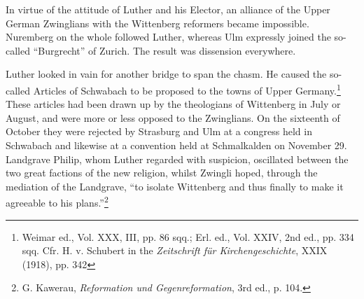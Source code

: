 In virtue of the attitude of Luther and his Elector, an alliance of
the Upper German Zwinglians with the Wittenberg reformers became impossible.
Nuremberg on the whole followed Luther, whereas
Ulm expressly joined the so-called “Burgrecht” of Zurich. The result
was dissension everywhere.

Luther looked in vain for another bridge to span the chasm. He
caused the so-called Articles of Schwabach to be proposed to the
towns of Upper Germany.\footnote
{Weimar ed., Vol. XXX, III, pp. 86 sqq.; Erl. ed., Vol. XXIV, 2nd ed., pp. 334 sqq.
Cfr. H. v. Schubert in the \textit{Zeitschrift für Kirchengeschichte}, XXIX (1918), pp. 342}
These articles had been drawn up by
the theologians of Wittenberg in July or August, and were more
or less opposed to the Zwinglians. On the sixteenth of October they
were rejected by Strasburg and Ulm at a congress held in Schwabach
and likewise at a convention held at Schmalkalden on November 29.
Landgrave Philip, whom Luther regarded with suspicion, oscillated
between the two great factions of the new religion, whilst Zwingli
hoped, through the mediation of the Landgrave, “to isolate Wittenberg
and thus finally to make it agreeable to his plans.”\footnote
{G. Kawerau, \textit{Reformation und Gegenreformation}, 3rd ed., p. 104.}
